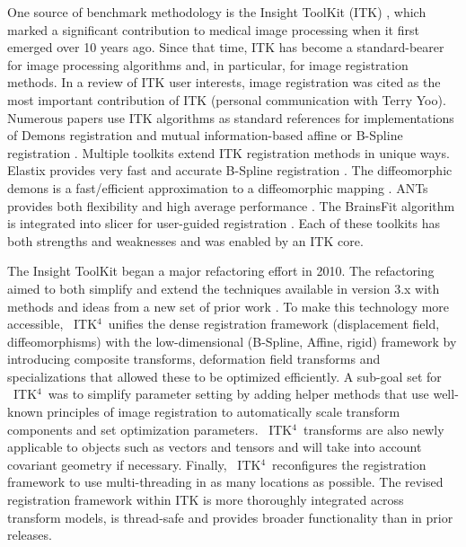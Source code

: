 \documentclass{frontiersSCNS}
\newcommand{\tk}{~ITK$^{\text{4}}$~}
\begin{document}
One source of benchmark methodology is the Insight ToolKit (ITK)
\cite{Yoo2002,Ackerman2003}, which marked a significant contribution to
medical image processing when it first emerged over 10 years ago.
Since that time, ITK has become a standard-bearer for image
processing algorithms and, in particular, for image registration
methods.  In a review of ITK user interests, image registration was cited as the most important
contribution of ITK (personal communication with Terry Yoo).  Numerous papers use ITK
algorithms as standard references for implementations of Demons
registration and mutual information-based affine or B-Spline
registration \cite{2004,Shelton2005,Floca2007,Chen2008,Cheung2009}.
Multiple toolkits extend ITK registration methods in unique ways.
Elastix provides very fast and accurate B-Spline registration
\cite{Klein2010,Murphy2011}.  The diffeomorphic demons is a fast/efficient
approximation to a diffeomorphic mapping \cite{Vercauteren2009}.  
ANTs provides both flexibility and high average performance
\cite{Avants2011}.  The BrainsFit algorithm is integrated into slicer
for user-guided registration \cite{Kikinis2011}.
Each of these toolkits has both strengths and weaknesses
\cite{Klein2010,Murphy2011} and was enabled by an ITK core.    

The Insight ToolKit began a major refactoring effort in 2010.
The refactoring aimed to both simplify and extend the techniques available in version
3.x with methods and ideas from a new set of prior work
\cite{Jenkinson2001,Christensen1996,Rueckert1999,Miller2005,Peyrat2010,Avants2011}.
To make this technology more accessible, \tk unifies the dense
registration framework (displacement field, diffeomorphisms)
with the low-dimensional (B-Spline, Affine, rigid) framework by
introducing composite transforms, deformation field transforms and
specializations that allowed these to be optimized efficiently.  A sub-goal set for \tk was to simplify
parameter setting by adding helper methods that use well-known
principles of image registration to automatically scale transform
components and set optimization parameters.  \tk transforms are also
newly applicable to objects such as vectors and tensors and will take into account covariant geometry if
necessary.  Finally, \tk reconfigures the registration framework
to use multi-threading in as many locations as possible.
The revised registration framework within ITK is more thoroughly
integrated across transform models, is thread-safe and provides
broader functionality than in prior releases. 
\end{document}

